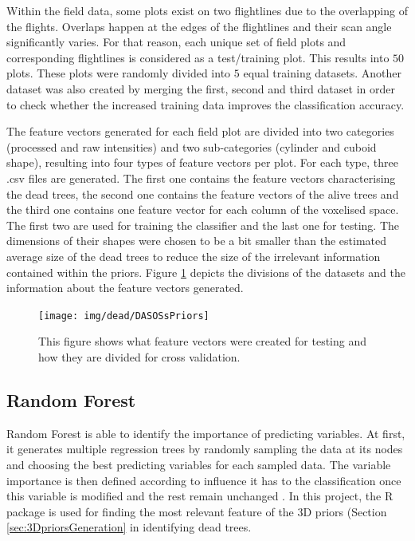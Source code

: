 \documentclass{subfiles}
\begin{document}
\par Within the field data, some plots exist on two flightlines due to the overlapping of the flights. Overlaps happen at the edges of the flightlines and their scan angle significantly varies. For that reason,  each unique set of field plots and corresponding flightlines is considered as a test/training plot. This results into $50$ plots. These plots were randomly divided into $5$ equal training datasets. Another dataset was also created by merging the first, second and third dataset in order to check whether the increased training data improves the classification accuracy.

\par {\color{blue} The feature vectors generated for each field plot are divided into two categories (processed and raw intensities) and two sub-categories (cylinder and cuboid shape), resulting into four types of feature vectors per plot. For each type, three .csv files are generated. The first one contains the feature vectors characterising the dead trees, the second one contains the feature vectors of the alive trees and the third one contains one feature vector for each column of the voxelised space. The first two are used for training the classifier and the last one for testing. The dimensions of their shapes were chosen to be a bit smaller than the estimated average size of the dead trees to reduce the size of the irrelevant information contained within the priors. Figure \ref{fig:DASOSsPriors} depicts the divisions of the datasets and the information about the feature vectors generated. }


\begin{figure} [h!]
	\centering
	\texttt{[image: img/dead/DASOSsPriors]}
	\caption{This figure shows what feature vectors were created for testing and how they are divided for cross validation.}
	\label{fig:DASOSsPriors}
\end{figure}


	

	
\subsection{Random Forest}\label{sec:RandomForest}
	
	
	\par Random Forest is able to identify the importance of predicting variables. At first, it generates multiple regression trees by randomly sampling the data at its nodes and choosing the best predicting variables for each sampled data. The variable importance is then defined according to influence it has to the classification once this variable is modified and the rest remain unchanged \cite{Liaw2002}. In this project, the R package is used for finding the most relevant feature of the 3D priors (Section \ref{sec:3DpriorsGeneration} in identifying dead trees. 
\end{document}
